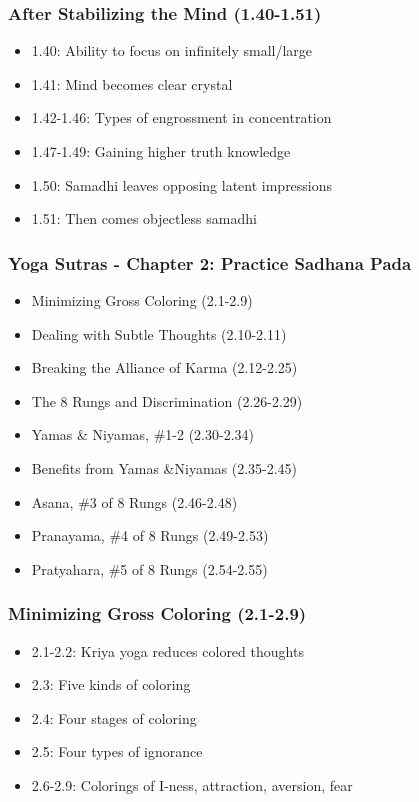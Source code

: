 \begin{frame}[fragile]\frametitle{After Stabilizing the Mind (1.40-1.51)}
\begin{itemize}  
\item 1.40: Ability to focus on infinitely small/large 
\item 1.41: Mind becomes clear crystal
\item 1.42-1.46: Types of engrossment in concentration
\item 1.47-1.49: Gaining higher truth knowledge
\item 1.50: Samadhi leaves opposing latent impressions
\item 1.51: Then comes objectless samadhi
\end{itemize}
\end{frame}

\begin{frame}[fragile]\frametitle{Yoga Sutras - Chapter 2: Practice Sadhana Pada}
\begin{itemize}
\item Minimizing Gross Coloring (2.1-2.9)
\item Dealing with Subtle Thoughts (2.10-2.11)  
\item Breaking the Alliance of Karma (2.12-2.25)
\item The 8 Rungs and Discrimination (2.26-2.29)
\item Yamas \& Niyamas, \#1-2 (2.30-2.34)
\item Benefits from Yamas \&Niyamas (2.35-2.45)
\item Asana, \#3 of 8 Rungs (2.46-2.48)
\item Pranayama, \#4 of 8 Rungs (2.49-2.53)
\item Pratyahara, \#5 of 8 Rungs (2.54-2.55)
\end{itemize}
\end{frame}

\begin{frame}[fragile]\frametitle{Minimizing Gross Coloring (2.1-2.9)}
\begin{itemize}
\item 2.1-2.2: Kriya yoga reduces colored thoughts
\item 2.3: Five kinds of coloring
\item 2.4: Four stages of coloring 
\item 2.5: Four types of ignorance
\item 2.6-2.9: Colorings of I-ness, attraction, aversion, fear
\end{itemize}
\end{frame}

